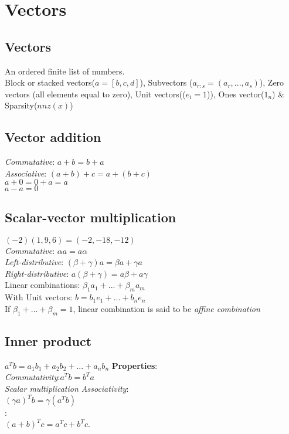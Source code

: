 \section{Vectors}
\subsection*{Vectors}
\textbullet An ordered finite list of numbers.\\
\textbullet Block or stacked vectors($a = [b, c, d]$), Subvectors ($a_{r:s} = (a_r,...,a_s)$), Zero vectors (all elements equal to zero), Unit vectors(($e_i = 1$)), Ones vector($1_n$) \& Sparsity($nnz(x)$)

\subsection*{Vector addition}
\textbullet \textit{Commutative}: $a + b = b + a$\\
\textbullet \textit{Associative}: $(a + b) + c = a + (b + c)$\\
\textbullet $a+0 = 0+a = a$\\
\textbullet $a - a = 0$
\subsection{Scalar-vector multiplication}
$(-2)(1, 9, 6)=(-2, -18, -12)$\\
\textbullet \textit{Commutative}: $\alpha a = a \alpha$\\
\textbullet \textit{Left-distributive}: $(\beta + \gamma)a = \beta a + \gamma a$\\
\textbullet \textit{Right-distributive}: $a(\beta + \gamma) = a\beta + a\gamma $ \\

Linear combinations: $\beta_1 a_1 + ... + \beta_m a_m$\\
\textbullet With Unit vectors: $b = b_1 e_1 +...+ b_n e_n$ \\
\textbullet If $\beta_1 +...+ \beta_m = 1$, linear combination is said to be \textit{affine combination}

\subsection{Inner product}
$a^T b = a_1 b_1 +a_2 b_2 +...+ a_n b_n$
\textbf{Properties}:\\
\textbullet \textit{Commutativity}:$a^T b = b^T a$\\
\textbullet \textit{Scalar multiplication Associativity}:\\ $(\gamma a)^T b = \gamma(a^T b)$\\
:\\
$(a + b)^T c = a^T c + b^T c.$

